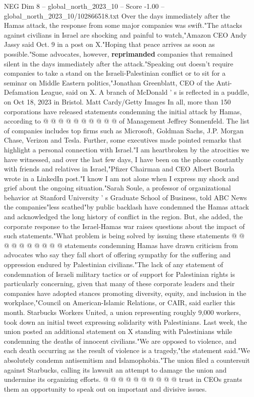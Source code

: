 \begin{textsample}{NEG Dim 8 – global\_north\_2023\_10 – Score -1.00 – global\_north\_2023\_10/102866518.txt}
Over the days immediately after the Hamas attack, the response from some major companies was swift."The attacks against civilians in Israel are shocking and painful to watch,"Amazon CEO Andy Jassy said Oct. 9 in a post on X."Hoping that peace arrives as soon as possible."Some advocates, however, \textbf{reprimanded} companies that remained silent in the days immediately after the attack."Speaking out doesn't require companies to take a stand on the Israeli-Palestinian conflict or to sit for a seminar on Middle Eastern politics,"Jonathan Greenblatt, CEO of the Anti-Defamation League, said on X.
A branch of McDonald ' s is reflected in a puddle, on Oct 18, 2023 in Bristol.
Matt Cardy/Getty Images In all, more than 150 corporations have released statements condemning the initial attack by Hamas, according to @ @ @ @ @ @ @ @ @ @ of Management Jeffrey Sonnenfeld.
The list of companies includes top firms such as Microsoft, Goldman Sachs, J.P.
Morgan Chase, Verizon and Tesla.
Further, some executives made pointed remarks that highlight a personal connection with Israel."I am heartbroken by the atrocities we have witnessed, and over the last few days, I have been on the phone constantly with friends and relatives in Israel,"Pfizer Chairman and CEO Albert Bourla wrote in a LinkedIn post."I know I am not alone when I express my shock and grief about the ongoing situation."Sarah Soule, a professor of organizational behavior at Stanford University ' s Graduate School of Business, told ABC News the companies"less scathed"by public backlash have condemned the Hamas attack and acknowledged the long history of conflict in the region.
But, she added, the corporate response to the Israel-Hamas war raises questions about the impact of such statements."What problem is being solved by issuing these statements @ @ @ @ @ @ @ @ @ @ statements condemning Hamas have drawn criticism from advocates who say they fall short of offering sympathy for the suffering and oppression endured by Palestinian civilians."The lack of any statement of condemnation of Israeli military tactics or of support for Palestinian rights is particularly concerning, given that many of these corporate leaders and their companies have adopted stances promoting diversity, equity, and inclusion in the workplace,"Council on American-Islamic Relations, or CAIR, said earlier this month.
Starbucks Workers United, a union representing roughly 9,000 workers, took down an initial tweet expressing solidarity with Palestinians.
Last week, the union posted an additional statement on X standing with Palestinians while condemning the deaths of innocent civilians."We are opposed to violence, and each death occurring as the result of violence is a tragedy,"the statement said."We absolutely condemn antisemitism and Islamophobia."The union filed a countersuit against Starbucks, calling its lawsuit an attempt to damage the union and undermine its organizing efforts. @ @ @ @ @ @ @ @ @ @ trust in CEOs grants them an opportunity to speak out on important and divisive issues.

\end{textsample}
